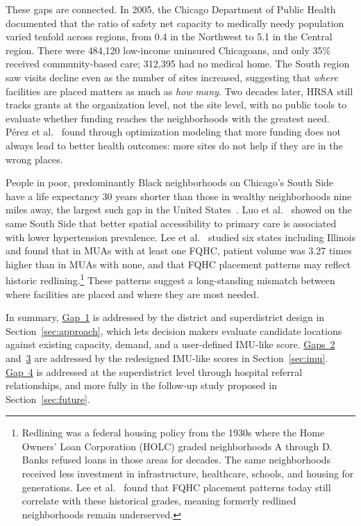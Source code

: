\documentclass[11pt]{article}
\begin{document}
These gaps are connected. In 2005, the Chicago
Department of Public
Health~\cite{salem2005casting} documented that the
ratio of safety net capacity to medically needy
population varied tenfold across regions,
from 0.4 in the Northwest to 5.1 in the Central
region. There were 484,120 low-income uninsured
Chicagoans, and only 35\% received community-based
care; 312,395 had no medical home. The South region saw visits decline even as
the number of sites
increased, suggesting that \emph{where} facilities
are placed matters as much as \emph{how many}. Two
decades later, HRSA still tracks grants at the
organization level, not the site level, with no
public tools to evaluate whether funding reaches
the neighborhoods with the greatest need.
P\'{e}rez et al.~\cite{perez2021decision} found
through optimization modeling that more funding does
not always lead to better health outcomes: more
sites do not help if they are in the wrong places.

People in poor, predominantly Black neighborhoods
on Chicago's South Side have a life expectancy 30
years shorter than those in wealthy neighborhoods
nine miles away, the largest such gap in the United
States~\cite{smithcommunity}. Luo et
al.~\cite{luo2022spatial} showed on the same South
Side that better spatial accessibility to primary
care is associated with lower hypertension
prevalence. Lee et al.~\cite{lee2023spatial} studied
six states including Illinois and found that in MUAs
with at least one FQHC, patient volume was 3.27 times
higher than in MUAs with none, and that FQHC placement patterns may
reflect historic redlining.\footnote{Redlining was a federal housing
policy from the 1930s where the Home Owners' Loan
Corporation (HOLC) graded neighborhoods A through D.
Banks refused loans in those areas for decades. The
same neighborhoods received less investment in
infrastructure, healthcare, schools, and housing
for generations. Lee et al.~\cite{lee2023spatial}
found that FQHC placement patterns today still
correlate with these historical grades, meaning
formerly redlined neighborhoods remain underserved.}
These patterns suggest a long-standing
mismatch between where facilities are placed and
where they are most needed.

In summary, \hyperref[gap:location]{Gap~1} is
addressed by the district and superdistrict design
in Section~\ref{sec:approach}, which lets decision makers evaluate candidate locations against existing capacity, demand, and a user-defined IMU-like score. \hyperref[gap:imu]{Gaps~2} and~\hyperref[gap:mua]{3} are addressed by the redesigned IMU-like scores in
Section~\ref{sec:imu}. \hyperref[gap:referral]{Gap~4} is
addressed at the superdistrict level through
hospital referral relationships, and more fully in the follow-up study proposed in
Section~\ref{sec:future}.
\end{document}
